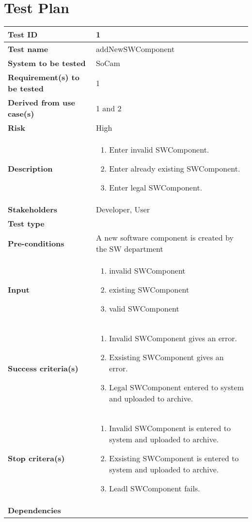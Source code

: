 \chapter{Test Plan}
\label{chp:testplan}

\clearpage

		\begin{table}[H]
			\begin{tabular}{| p{4cm} | p{10cm} |}
			\hline
			\rowcolor{gray}
				{\bf Test ID} & 1 \\ \hline
				{\bf Test name} & addNewSWComponent \\ \hline
				{\bf System to be tested} & SoCam \\ \hline
				{\bf Requirement(s) to be tested} & 1 \\ \hline
				{\bf Derived from use case(s)} & 1 and 2 \\ \hline
				{\bf Risk} & High \\ \hline
				{\bf Description} & 
					\begin{enumerate}
						\item Enter invalid SWComponent.
						\item Enter already existing SWComponent.
						\item Enter legal SWComponent.
					\end{enumerate}
				\\ \hline
				{\bf Stakeholders} & Developer, User \\ \hline
				{\bf Test type} & \\ \hline
				{\bf Pre-conditions} & A new software component is created by the 
				SW department\\ \hline
				{\bf Input} & 
					\begin{enumerate}
						\item invalid SWComponent
						\item existing SWComponent
						\item valid SWComponent
					\end{enumerate}
				\\ \hline
				{\bf Success criteria(s)} & 
					\begin{enumerate}
						\item Invalid SWComponent gives an error.
						\item Exsisting SWComponent gives an error.
						\item Legal SWComponent entered to system and uploaded to archive.
					\end{enumerate}
				\\ \hline
				{\bf Stop critera(s)} &  
					\begin{enumerate}
						\item Invalid SWComponent is entered to system and uploaded to archive.
						\item Exsisting SWComponent is entered to system and uploaded to archive.
						\item Leadl SWComponent fails.
					\end{enumerate} \\ \hline
				{\bf Dependencies} & \\ \hline
			\end{tabular}
		\end{table}

